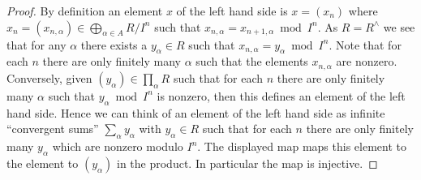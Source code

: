 \begin{proof}
By definition an element $x$ of the left hand side is $x = (x_n)$ where
$x_n = (x_{n, \alpha}) \in \bigoplus\nolimits_{\alpha \in A} R/I^n$
such that $x_{n, \alpha} = x_{n + 1, \alpha} \bmod I^n$.
As $R = R^\wedge$ we see that for any $\alpha$ there exists a $y_\alpha \in R$
such that $x_{n, \alpha} = y_\alpha \bmod I^n$. Note that for each $n$ there
are only finitely many $\alpha$ such that the elements $x_{n, \alpha}$ are
nonzero. Conversely, given $(y_\alpha) \in \prod_\alpha R$ such that for each
$n$ there are only finitely many $\alpha$ such that $y_{\alpha} \bmod I^n$
is nonzero, then this defines an element of the left hand side.
Hence we can think of an element of the left hand side as infinite
``convergent sums'' $\sum_\alpha y_\alpha$ with $y_\alpha \in R$
such that for each $n$ there are only finitely many $y_\alpha$
which are nonzero modulo $I^n$. The displayed map maps this element
to the element to $(y_\alpha)$ in the product.
In particular the map is injective.


\end{proof}
